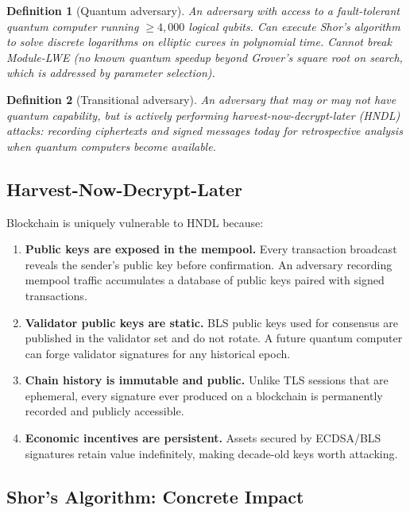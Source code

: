 \documentclass[11pt,a4paper]{article}
\newtheorem{definition}{Definition}[section]
\begin{document}
\begin{definition}[Quantum adversary]
\label{def:quantum}
An adversary with access to a fault-tolerant quantum computer running $\geq 4{,}000$
logical qubits. Can execute Shor's algorithm to solve discrete logarithms on elliptic
curves in polynomial time. Cannot break Module-LWE (no known quantum speedup beyond
Grover's square root on search, which is addressed by parameter selection).
\end{definition}

\begin{definition}[Transitional adversary]
\label{def:transitional}
An adversary that may or may not have quantum capability, but is actively performing
\emph{harvest-now-decrypt-later} (HNDL) attacks: recording ciphertexts and signed
messages today for retrospective analysis when quantum computers become available.
\end{definition}

\subsection{Harvest-Now-Decrypt-Later}

Blockchain is uniquely vulnerable to HNDL because:

\begin{enumerate}[leftmargin=2em]
  \item \textbf{Public keys are exposed in the mempool.} Every transaction broadcast
        reveals the sender's public key before confirmation. An adversary recording
        mempool traffic accumulates a database of public keys paired with signed
        transactions.
  \item \textbf{Validator public keys are static.} BLS public keys used for consensus
        are published in the validator set and do not rotate. A future quantum computer
        can forge validator signatures for any historical epoch.
  \item \textbf{Chain history is immutable and public.} Unlike TLS sessions that
        are ephemeral, every signature ever produced on a blockchain is permanently
        recorded and publicly accessible.
  \item \textbf{Economic incentives are persistent.} Assets secured by ECDSA/BLS
        signatures retain value indefinitely, making decade-old keys worth attacking.
\end{enumerate}

\subsection{Shor's Algorithm: Concrete Impact}
\end{document}
